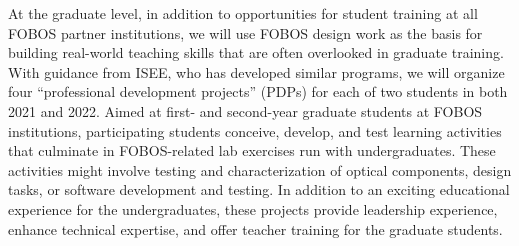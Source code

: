 \documentclass[oneside,11pt]{amsart}
\begin{document}
At the graduate level, in addition to opportunities for student training at all FOBOS partner institutions, we will use FOBOS design work as the basis for building real-world teaching skills that are often overlooked in graduate training. With guidance from ISEE, who has developed similar programs, we will organize four ``professional development projects'' (PDPs) for each of two students in both 2021 and 2022.  Aimed at first- and second-year graduate students at FOBOS institutions, participating students conceive, develop, and test learning activities that culminate in FOBOS-related lab exercises run with undergraduates.  These activities might involve testing and characterization of optical components, design tasks, or software development and testing.  In addition to an exciting educational experience for the undergraduates, these projects provide leadership experience, enhance technical expertise, and offer teacher training for the graduate students.






\end{document}
